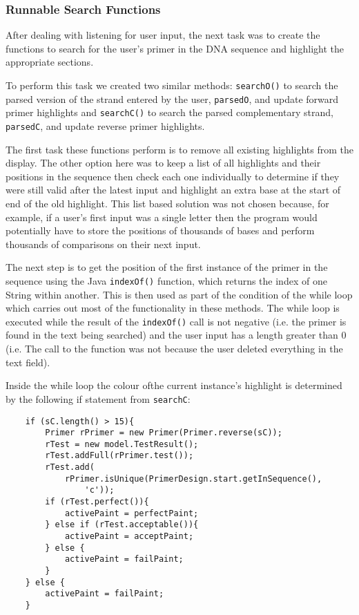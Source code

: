\subsubsection{Runnable Search Functions}

After dealing with listening for user input, the next task was to create
the functions to search for the user's primer in the DNA sequence and
highlight the appropriate sections.

To perform this task we created two similar methods: \texttt{searchO()}
to search the parsed version of the strand entered by the user,
\texttt{parsedO}, and update forward primer highlights and
\texttt{searchC()} to search the parsed complementary strand,
\texttt{parsedC}, and update reverse primer highlights.

The first task these functions perform is to remove all existing
highlights from the display. The other option here was to keep a list of
all highlights and their positions in the sequence then check each one
individually to determine if they were still valid after the latest
input and highlight an extra base at the start of end of the old
highlight. This list based solution was not chosen because, for example,
if a user's first input was a single letter then the program would
potentially have to store the positions of thousands of bases and
perform thousands of comparisons on their next input.

The next step is to get the position of the first instance of the primer
in the sequence using the Java \texttt{indexOf()} function, which returns
the index of one String within another. This is then
used as part of the condition of the while loop which carries out most
of the functionality in these methods. The while loop is executed while
the result of the \texttt{indexOf()} call is not negative (i.e. the
primer is found in the text being searched) and the user input has a
length greater than 0 (i.e. The call to the function was not because the
user deleted everything in the text field).

Inside the while loop the colour ofthe current instance's highlight is
determined by the following if statement from \texttt{searchC}:

\begin{verbatim}
    if (sC.length() > 15){
        Primer rPrimer = new Primer(Primer.reverse(sC));
        rTest = new model.TestResult();
        rTest.addFull(rPrimer.test());
        rTest.add(
            rPrimer.isUnique(PrimerDesign.start.getInSequence(),
                'c'));
        if (rTest.perfect()){
            activePaint = perfectPaint;
        } else if (rTest.acceptable()){
            activePaint = acceptPaint;
        } else {
            activePaint = failPaint;
        }
    } else {
        activePaint = failPaint;
    } 
\end{verbatim}

